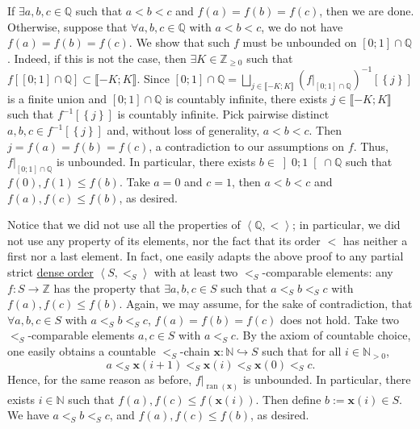\begin{solution}
    If \( \exists a,b,c \in \mathbb{Q} \) such that \( a < b < c \) and \( f\left(a\right) = f\left(b\right) = f\left(c\right) \), then we are done. Otherwise, suppose that \( \forall a,b,c \in \mathbb{Q} \) with \( a < b < c \), we do not have \( f\left(a\right) = f\left(b\right) = f\left(c\right) \). We show that such \( f \) must be unbounded on \( \left[0;1\right] \cap \mathbb{Q} \). Indeed, if this is not the case, then \( \exists K \in \mathbb{Z}_{\geq0} \) such that \( f\left[\left[0;1\right] \cap \mathbb{Q}\right] \subset \llbracket -K;K \rrbracket \). Since \( \left[0;1\right] \cap \mathbb{Q} = \bigsqcup_{j \in \llbracket -K;K \rrbracket} \left(f|_{\left[0;1\right] \cap \mathbb{Q}}\right)^{-1}\left[\left\{j\right\}\right] \) is a finite union and \( \left[0;1\right] \cap \mathbb{Q} \) is countably infinite, there exists \( j \in \llbracket -K;K \rrbracket \) such that \( f^{-1}\left[\left\{j\right\}\right] \) is countably infinite. Pick pairwise distinct \( a,b,c \in f^{-1}\left[\left\{j\right\}\right] \) and, without loss of generality, \( a < b < c \). Then \( j = f\left(a\right) = f\left(b\right) = f\left(c\right) \), a contradiction to our assumptions on \( f \). Thus, \( f|_{\left[0;1\right] \cap \mathbb{Q}} \) is unbounded. In particular, there exists \( b \in \left]0;1\right[ \cap \mathbb{Q} \) such that \( f\left(0\right), f\left(1\right) \leq f\left(b\right) \). Take \( a = 0 \) and \( c = 1 \), then \( a < b < c \) and \( f\left(a\right), f\left(c\right) \leq f\left(b\right) \), as desired.
    \begin{remark}
        Notice that we did not use all the properties of \( \left\langle\mathbb{Q},<\right\rangle \); in particular, we did not use any property of its elements, nor the fact that its order \( < \) has neither a first nor a last element. In fact, one easily adapts the above proof to any partial strict \href{https://en.wikipedia.org/wiki/Dense_order}{dense order} \( \left\langle S,<_S\right\rangle \) with at least two \( <_S \)-comparable elements: any \( f : S \to \mathbb{Z} \) has the property that \( \exists a,b,c \in S \) such that \( a <_S b <_S c \) with \( f\left(a\right), f\left(c\right) \leq f\left(b\right) \). Again, we may assume, for the sake of contradiction, that \( \forall a,b,c \in S \) with \( a <_S b <_S c \), \( f\left(a\right) = f\left(b\right) = f\left(c\right) \) does not hold. Take two \( <_S \)-comparable elements \( a,c \in S \) with \( a <_S c \). By the axiom of countable choice, one easily obtains a countable \( <_S \)-chain \( \mathbf{x} : \mathbb{N} \hookrightarrow S \) such that for all \( i \in \mathbb{N}_{>0} \),
        \[
            a <_S \mathbf{x}\left(i+1\right) <_S \mathbf{x}\left(i\right) <_S \mathbf{x}\left(0\right) <_S c.
        \]
        Hence, for the same reason as before, \( f|_{\operatorname{ran}\left(\mathbf{x}\right)} \) is unbounded. In particular, there exists \( i \in \mathbb{N} \) such that \( f\left(a\right), f\left(c\right) \leq f\left(\mathbf{x}\left(i\right)\right) \). Then define \( b := \mathbf{x}\left(i\right) \in S \). We have \( a <_S b <_S c \), and \( f\left(a\right), f\left(c\right) \leq f\left(b\right) \), as desired.
    \end{remark}
\end{solution}
